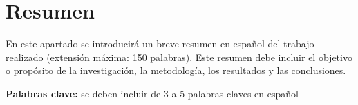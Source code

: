 \chapter{Resumen}

En este apartado se introducirá un breve resumen en español del trabajo realizado (extensión máxima: 150 palabras). Este resumen debe incluir el objetivo o propósito de la investigación, la metodología, los resultados y las conclusiones.

{\bf Palabras clave:} se deben incluir de 3 a 5 palabras claves en español